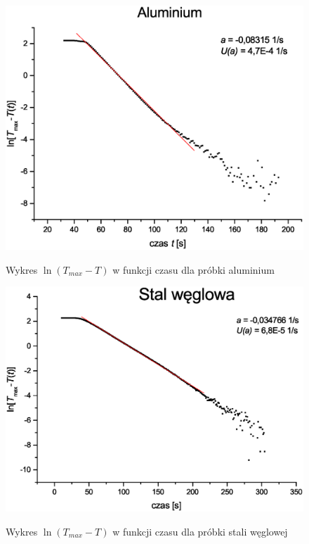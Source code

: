 \documentclass[11pt]{article}
\begin{document}
\begin{figure}[h!]
\begin{center}
\includegraphics[height=0.4\textheight]{aluminiumg.eps}
\caption{Wykres $\ln (T_{max} - T)$ w funkcji czasu dla próbki aluminium}{\label{WYK_ALU}}
\end{center}
\end{figure}

\begin{figure}[h!]
\begin{center}
\includegraphics[height=0.4\textheight]{stal_weglowa.eps}
\caption{Wykres $\ln (T_{max} - T)$ w funkcji czasu dla próbki stali węglowej}{\label{WYK_STAL}}
\end{center}
\end{figure}
\end{document}
